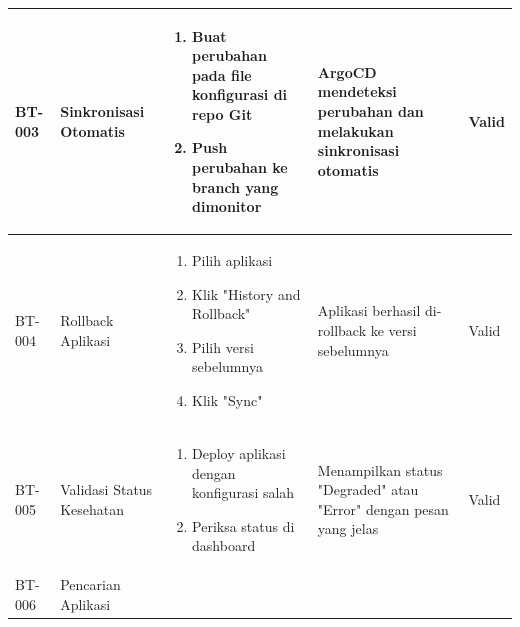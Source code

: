 \begin{table}[h]
\begin{adjustbox}{width=\textwidth}
\begin{tabular}{|p{0.8cm}|p{2.2cm}|p{4cm}|p{3.5cm}|p{1.2cm}|}
      BT-003            & Sinkronisasi Otomatis     & \begin{enumerate}[leftmargin=*,noitemsep,topsep=0pt,label=\arabic*.,widest=99]
                                                        \item Buat perubahan pada file konfigurasi di repo Git
                                                        \item Push perubahan ke branch yang dimonitor
                                                      \end{enumerate} & ArgoCD mendeteksi perubahan dan melakukan sinkronisasi otomatis    & Valid                                                                          \\ \hline
      BT-004            & Rollback Aplikasi         & \begin{enumerate}[leftmargin=*,noitemsep,topsep=0pt,label=\arabic*.,widest=99]
                                                        \item Pilih aplikasi
                                                        \item Klik "History and Rollback"
                                                        \item Pilih versi sebelumnya
                                                        \item Klik "Sync"
                                                      \end{enumerate} & Aplikasi berhasil di-rollback ke versi sebelumnya                  & Valid                                                                          \\ \hline
      BT-005            & Validasi Status Kesehatan & \begin{enumerate}[leftmargin=*,noitemsep,topsep=0pt,label=\arabic*.,widest=99]
                                                        \item Deploy aplikasi dengan konfigurasi salah
                                                        \item Periksa status di dashboard
                                                      \end{enumerate} & Menampilkan status "Degraded" atau "Error" dengan pesan yang jelas & Valid                                                                          \\ \hline
      BT-006            & Pencarian Aplikasi        & \begin{enumerate}[leftmargin=*,noitemsep,topsep=0pt,label=\arabic*.,widest=99]

\end{enumerate}
\end{tabular}
\end{adjustbox}
\end{table}
